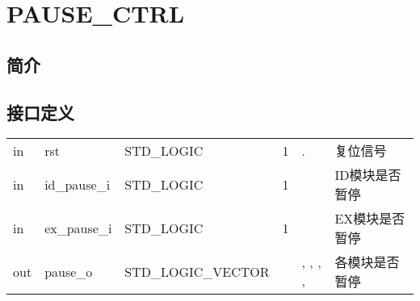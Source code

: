 \documentclass{article}
\begin{document}
\section{PAUSE_CTRL}
\label{sec:PAUSE_CTRL}

\subsection{简介}

\FloatBarrier
\subsection{接口定义}

\begin{center}




    \tablelasttail{\bottomrule}

    \small
    \begin{supertabular}{lllllp{2cm}}

    in & rst\label{PAUSE_CTRL:rst} & STD_LOGIC & 1 & . & 复位信号 \\
    in & id_pause_i\label{PAUSE_CTRL:id_pause_i} & STD_LOGIC & 1 &  & ID模块是否暂停 \\
    in & ex_pause_i\label{PAUSE_CTRL:ex_pause_i} & STD_LOGIC & 1 &  & EX模块是否暂停 \\
    out & pause_o\label{PAUSE_CTRL:pause_o} & STD_LOGIC_VECTOR &  & , , , ,  & 各模块是否暂停 \\

    \end{supertabular}
\end{center}
\FloatBarrier
\end{document}
